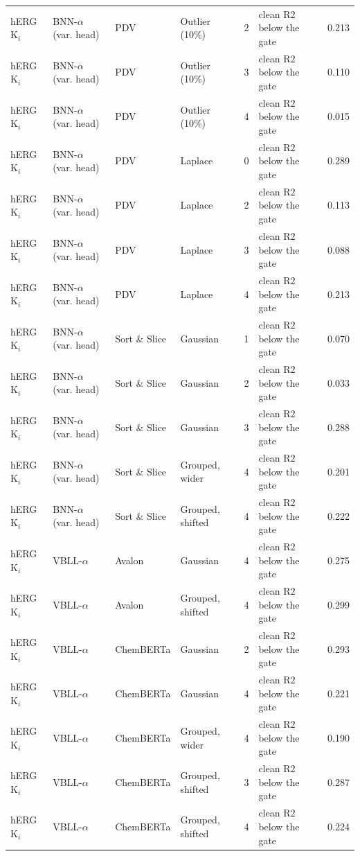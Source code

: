 {\begin{longtable}{llllcll}
hERG K$_i$ & BNN-$\alpha$ (var. head) & PDV & Outlier (10\%) & 2 & clean R2 below the gate & 0.213 \\
hERG K$_i$ & BNN-$\alpha$ (var. head) & PDV & Outlier (10\%) & 3 & clean R2 below the gate & 0.110 \\
hERG K$_i$ & BNN-$\alpha$ (var. head) & PDV & Outlier (10\%) & 4 & clean R2 below the gate & 0.015 \\
hERG K$_i$ & BNN-$\alpha$ (var. head) & PDV & Laplace & 0 & clean R2 below the gate & 0.289 \\
hERG K$_i$ & BNN-$\alpha$ (var. head) & PDV & Laplace & 2 & clean R2 below the gate & 0.113 \\
hERG K$_i$ & BNN-$\alpha$ (var. head) & PDV & Laplace & 3 & clean R2 below the gate & 0.088 \\
hERG K$_i$ & BNN-$\alpha$ (var. head) & PDV & Laplace & 4 & clean R2 below the gate & 0.213 \\
hERG K$_i$ & BNN-$\alpha$ (var. head) & Sort \& Slice & Gaussian & 1 & clean R2 below the gate & 0.070 \\
hERG K$_i$ & BNN-$\alpha$ (var. head) & Sort \& Slice & Gaussian & 2 & clean R2 below the gate & 0.033 \\
hERG K$_i$ & BNN-$\alpha$ (var. head) & Sort \& Slice & Gaussian & 3 & clean R2 below the gate & 0.288 \\
hERG K$_i$ & BNN-$\alpha$ (var. head) & Sort \& Slice & Grouped, wider & 4 & clean R2 below the gate & 0.201 \\
hERG K$_i$ & BNN-$\alpha$ (var. head) & Sort \& Slice & Grouped, shifted & 4 & clean R2 below the gate & 0.222 \\
hERG K$_i$ & VBLL-$\alpha$ & Avalon & Gaussian & 4 & clean R2 below the gate & 0.275 \\
hERG K$_i$ & VBLL-$\alpha$ & Avalon & Grouped, shifted & 4 & clean R2 below the gate & 0.299 \\
hERG K$_i$ & VBLL-$\alpha$ & ChemBERTa & Gaussian & 2 & clean R2 below the gate & 0.293 \\
hERG K$_i$ & VBLL-$\alpha$ & ChemBERTa & Gaussian & 4 & clean R2 below the gate & 0.221 \\
hERG K$_i$ & VBLL-$\alpha$ & ChemBERTa & Grouped, wider & 4 & clean R2 below the gate & 0.190 \\
hERG K$_i$ & VBLL-$\alpha$ & ChemBERTa & Grouped, shifted & 3 & clean R2 below the gate & 0.287 \\
hERG K$_i$ & VBLL-$\alpha$ & ChemBERTa & Grouped, shifted & 4 & clean R2 below the gate & 0.224 \\

\end{longtable}}
